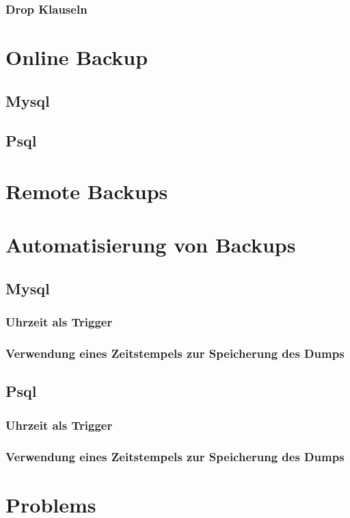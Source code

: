 \documentclass[10pt]{article}
\begin{document}
\subsubsection{Drop Klauseln}
\section{Online Backup}
\subsection{Mysql}
\subsection{Psql}

\section{Remote Backups}

\section{Automatisierung von Backups}
\subsection{Mysql}
\subsubsection{Uhrzeit als Trigger}
\subsubsection{Verwendung eines Zeitstempels zur Speicherung des Dumps}
\subsection{Psql}
\subsubsection{Uhrzeit als Trigger}
\subsubsection{Verwendung eines Zeitstempels zur Speicherung des Dumps}


\section{Problems}
\end{document}
